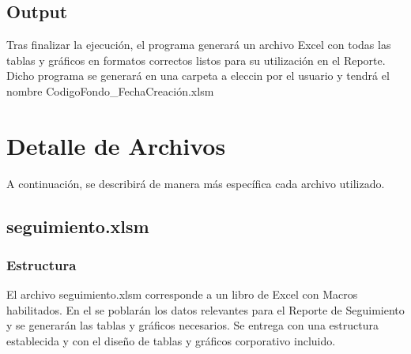 \documentclass{article}
\begin{document}
\subsection{Output}
Tras finalizar la ejecución, el programa generará un archivo Excel con todas las tablas y gráficos en formatos correctos listos para su utilización en el Reporte. Dicho programa se generará en una carpeta a eleccin por el usuario y tendrá el nombre  {CodigoFondo\_FechaCreación.xlsm}

\section{Detalle de Archivos}
A continuación, se describirá de manera más específica cada archivo utilizado.

\subsection{seguimiento.xlsm}
\subsubsection{Estructura}
El archivo seguimiento.xlsm corresponde a un libro de Excel con Macros habilitados. En el se poblarán los datos relevantes para el Reporte de Seguimiento y se generarán las tablas y gráficos necesarios. Se entrega con una estructura establecida y con el diseño de tablas y gráficos corporativo incluido. 
\end{document}
